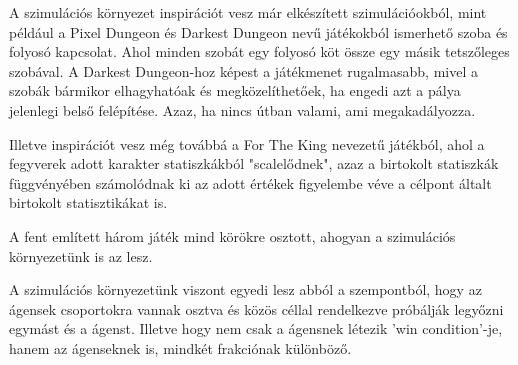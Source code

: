 

A szimulációs környezet inspirációt vesz már elkészített szimulációokból, mint például a Pixel Dungeon és Darkest Dungeon
nevű játékokból ismerhető szoba és folyosó kapcsolat. Ahol minden szobát egy folyosó köt össze egy másik tetszőleges szobával.
A Darkest Dungeon-hoz képest a játékmenet rugalmasabb, mivel a szobák bármikor elhagyhatóak és megközelíthetőek, ha engedi azt a pálya jelenlegi belső felépítése.
Azaz, ha nincs útban valami, ami megakadályozza.

Illetve inspirációt vesz még továbbá a For The King nevezetű játékból, ahol a fegyverek adott karakter statiszkákból "scalelődnek", azaz a birtokolt statiszkák függvényében
számolódnak ki az adott értékek figyelembe véve a célpont általt birtokolt statisztikákat is.

A fent említett három játék mind körökre osztott, ahogyan a szimulációs környezetünk is az lesz.

A szimulációs környezetünk viszont egyedi lesz abból a szempontból, hogy az ágensek csoportokra vannak osztva és közös céllal rendelkezve próbálják legyőzni egymást és a ágenst.
Illetve hogy nem csak a ágensnek létezik 'win condition'-je, hanem az ágenseknek is, mindkét frakciónak különböző.

